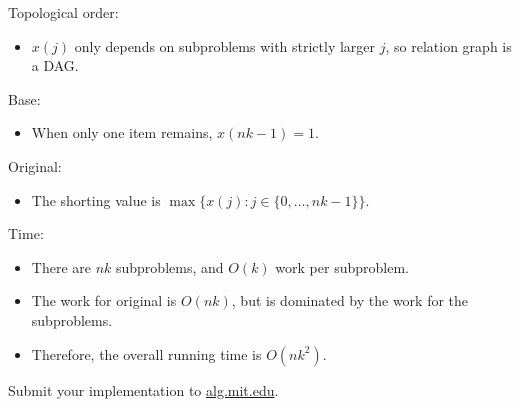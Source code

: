 \documentclass[12pt,twoside]{article}
\begin{document}
\begin{problems}
Topological order:
\begin{itemize}
    \item $x(j)$ only depends on subproblems with strictly larger $j$, so relation graph is a DAG.
\end{itemize}

Base:
\begin{itemize}
    \item When only one item remains, $x(nk-1)=1$.
\end{itemize}

Original:
\begin{itemize}
    \item The shorting value is $\max\{x(j): j\in \{0,\ldots,nk-1\}\}$.
\end{itemize}

Time:
\begin{itemize}
    \item There are $nk$ subproblems, and $O(k)$ work per subproblem. 
    \item The work for original is $O(nk)$, but is dominated by the work for the subproblems. 
    \item Therefore, the overall running time is $O(nk^2)$.
\end{itemize}

\begin{problemparts}
\problempart %
\problempart Submit your implementation to {\small\url{alg.mit.edu}}.
\end{problemparts}

\end{problems}
\end{document}
